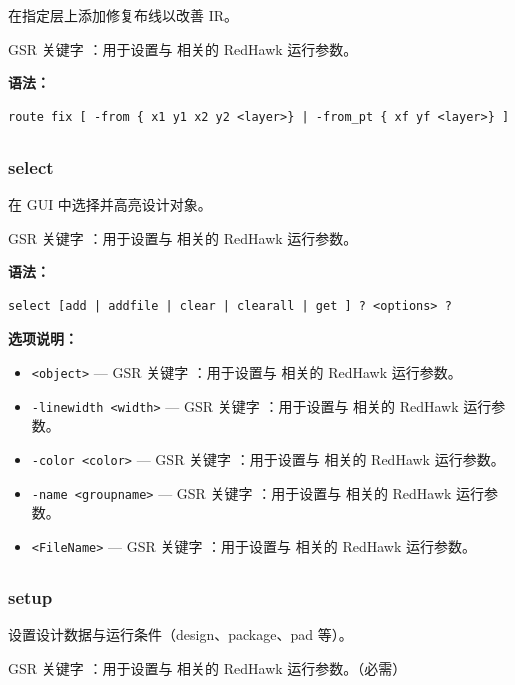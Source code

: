 在指定层上添加修复布线以改善 IR。

GSR 关键字 ：用于设置与  相关的 RedHawk 运行参数。

\textbf{语法：}
\begin{lstlisting}
route fix [ -from { x1 y1 x2 y2 <layer>} | -from_pt { xf yf <layer>} ]
\end{lstlisting}

\subsection{}
\subsubsection*{select}

在 GUI 中选择并高亮设计对象。

GSR 关键字 ：用于设置与  相关的 RedHawk 运行参数。

\textbf{语法：}
\begin{lstlisting}
select [add | addfile | clear | clearall | get ] ? <options> ?
\end{lstlisting}

\textbf{选项说明：}
\begin{itemize}
\item \texttt{<object>} — GSR 关键字 ：用于设置与  相关的 RedHawk 运行参数。
\item \texttt{-linewidth <width>} — GSR 关键字 ：用于设置与  相关的 RedHawk 运行参数。
\item \texttt{-color <color>} — GSR 关键字 ：用于设置与  相关的 RedHawk 运行参数。
\item \texttt{-name <groupname>} — GSR 关键字 ：用于设置与  相关的 RedHawk 运行参数。
\item \texttt{<FileName>} — GSR 关键字 ：用于设置与  相关的 RedHawk 运行参数。
\end{itemize}

\subsection{}
\subsubsection*{setup}

设置设计数据与运行条件（design、package、pad 等）。

GSR 关键字 ：用于设置与  相关的 RedHawk 运行参数。（必需）

